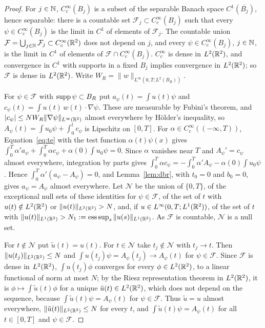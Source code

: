 \begin{proof}
For $j\in\mathbb{N}$, $C_c^\infty(B_j)$ is a subset of the separable Banach space
$C^1(\overline{B_j})$, hence separable: there is a countable set
$\mathcal F_j\subset C_c^\infty(B_j)$ such that every $\psi\in C_c^\infty(B_j)$ is the
limit in $C^1$ of elements of $\mathcal F_j$. The countable union
$\mathcal F=\bigcup_{j\in\mathbb{N}}\mathcal F_j\subset C_c^\infty(\mathbb{R}^2)$ does not depend on $j$,
and every $\psi\in C_c^\infty(B_j)$, $j\in\mathbb{N}$, is the limit in $C^1$ of elements of
$\mathcal F\cap C_c^\infty(B_j)$.
$C_c^\infty$ is dense in $L^2(\mathbb{R}^2)$, and convergence in
$C^1$ with supports in a fixed $B_j$ implies convergence in $L^2(\mathbb{R}^2)$; so
$\mathcal F$ is dense in $L^2(\mathbb{R}^2)$. Write
$W_R=\|w\|_{L^\infty(0,T;L^2(B_R))}$.

For $\psi\in\mathcal F$ with $\operatorname{supp}\psi\subset B_R$ put
$a_\psi(t)=\int u(t)\psi$ and $c_\psi(t)=\int u(t)\,w(t)\cdot\nabla\psi$. These
are measurable by Fubini's theorem, and $|c_\psi|\le NW_R\|\nabla\psi\|_{L^\infty(\mathbb{R}^2)}$
almost everywhere by H\"older's inequality, so
$A_\psi(t)=\int u_0\psi+\int_0^tc_\psi$ is Lipschitz on $[0,T]$. For
$\alpha\in C_c^\infty((-\infty,T))$, Equation~\eqref{eq:te} with the test
function $\alpha(t)\psi(x)$ gives
$\int_0^T\alpha'a_\psi+\int_0^T\alpha c_\psi+\alpha(0)\int u_0\psi=0$. Since
$\alpha$ vanishes near $T$ and $A_\psi'=c_\psi$ almost everywhere, integration
by parts gives
$\int_0^T\alpha c_\psi=-\int_0^T\alpha'A_\psi-\alpha(0)\int u_0\psi$. Hence
$\int_0^T\alpha'(a_\psi-A_\psi)=0$, and Lemma~\ref{lem:dbr}, with $t_0=0$ and
$b_0=0$, gives $a_\psi=A_\psi$ almost everywhere. Let $\mathcal N$ be the union
of $\{0,T\}$, of the exceptional null sets of these identities for
$\psi\in\mathcal F$, of the set of $t$ with $u(t)\notin L^2(\mathbb{R}^2)$ or
$\|u(t)\|_{L^2(\mathbb{R}^2)}>N$, and, if $u\in L^\infty(0,T;L^1(\mathbb{R}^2))$, of the set of $t$ with
$\|u(t)\|_{L^1(\mathbb{R}^2)}>N_1:=\operatorname{ess\,sup}_s\|u(s)\|_{L^1(\mathbb{R}^2)}$. As $\mathcal F$
is countable, $\mathcal N$ is a null set.

For $t\notin\mathcal N$ put $\tilde u(t)=u(t)$. For $t\in\mathcal N$ take
$t_j\notin\mathcal N$ with $t_j\to t$. Then $\|u(t_j)\|_{L^2(\mathbb{R}^2)}\le N$ and
$\int u(t_j)\psi=A_\psi(t_j)\to A_\psi(t)$ for $\psi\in\mathcal F$. Since
$\mathcal F$ is dense in $L^2(\mathbb{R}^2)$, $\int u(t_j)\phi$ converges for every
$\phi\in L^2(\mathbb{R}^2)$, to a linear functional of norm at most $N$; by the Riesz
representation theorem in $L^2(\mathbb{R}^2)$, it is $\phi\mapsto\int\tilde u(t)\phi$ for a unique
$\tilde u(t)\in L^2(\mathbb{R}^2)$, which does not depend on the sequence, because
$\int\tilde u(t)\psi=A_\psi(t)$ for $\psi\in\mathcal F$. Thus $\tilde u=u$ almost
everywhere, $\|\tilde u(t)\|_{L^2(\mathbb{R}^2)}\le N$ for every $t$, and
$\int\tilde u(t)\psi=A_\psi(t)$ for all $t\in[0,T]$ and $\psi\in\mathcal F$.


\end{proof}
